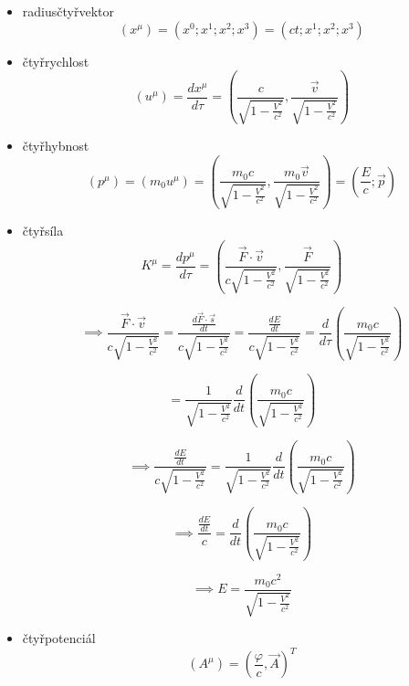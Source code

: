 \documentclass[a5paper,12pt]{article}
\begin{document}
\begin{itemize}
	\item radiusčtyřvektor
	\begin{equation*}
		(x^\mu) = \left( x^0; x^1; x^2; x^3 \right) = \left( ct; x^1; x^2; x^3 \right)
	\end{equation*}
	
	\item čtyřrychlost 
	\begin{equation*}
		(u^\mu) = \frac{d x^{\mu}}{d \tau} = \left(\frac{c}{\sqrt{1 - \frac{V^2}{c^2}}}, \frac{\vec{v}}{\sqrt{1 - \frac{V^2}{c^2}}}\right)
	\end{equation*}
	
	\item čtyřhybnost 
	\begin{equation*}
		(p^\mu) = (m_0 u^\mu) = \left(\frac{m_0 c}{\sqrt{1 - \frac{V^2}{c^2}}}, \frac{m_0 \vec{v}}{\sqrt{1 - \frac{V^2}{c^2}}}\right) = \left( \frac{E}{c}; \vec{p} \right)
	\end{equation*}
	
	\item čtyřsíla
	\begin{equation*}
		K^{\mu} = \frac{d p^{\mu}}{d \tau} = \left(\frac{ \vec{F} \cdot \vec{v} }{c\sqrt{1 - \frac{V^2}{c^2}}}, \frac{\vec{F}}{\sqrt{1 - \frac{V^2}{c^2}}}\right)
	\end{equation*}

\begin{equation*}
 \implies \frac{ \vec{F} \cdot \vec{v} }{c\sqrt{1 - \frac{V^2}{c^2}}} = \frac{ \frac{d \vec{F} \cdot \vec{s}}{dt} }{c\sqrt{1 - \frac{V^2}{c^2}}} = \frac{ \frac{d E}{dt} }{c\sqrt{1 - \frac{V^2}{c^2}}} = \frac{d}{d \tau} \left( \frac{m_0 c}{\sqrt{1 - \frac{V^2}{c^2}}} \right) 
\end{equation*}

\begin{equation*}
 = \frac{1}{\sqrt{1 - \frac{V^2}{c^2}}} \frac{d}{d t} \left( \frac{m_0 c}{\sqrt{1 - \frac{V^2}{c^2}}} \right)
\end{equation*}

\begin{equation*}
 \implies \frac{ \frac{d E}{dt} }{c\sqrt{1 - \frac{V^2}{c^2}}} = \frac{1}{\sqrt{1 - \frac{V^2}{c^2}}} \frac{d}{d t} \left( \frac{m_0 c}{\sqrt{1 - \frac{V^2}{c^2}}} \right)
\end{equation*}

\begin{equation*}
 \implies \frac{ \frac{d E}{dt} }{c} = \frac{d}{d t} \left( \frac{m_0 c}{\sqrt{1 - \frac{V^2}{c^2}}} \right)
\end{equation*}

\begin{equation*}
 \implies E = \frac{m_0 c^2}{\sqrt{1 - \frac{V^2}{c^2}}}
\end{equation*}
	
	\item čtyřpotenciál
	\begin{equation*}
		(A^{\mu}) = \left(\frac{\varphi}{c}, \vec{A}\right)^T
	\end{equation*}
	
\end{itemize}
\end{document}
